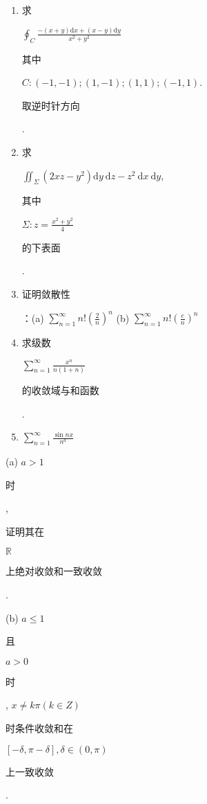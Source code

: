\documentclass[10pt]{article}
\begin{document}
\begin{enumerate}
  \item \begin{CJK}{UTF8}{mj}求\end{CJK} $\oint_{C} \frac{-(x+y) \mathrm{d} x+(x-y) \mathrm{d} y}{x^{2}+y^{2}}$ \begin{CJK}{UTF8}{mj}其中\end{CJK} $C:(-1,-1) ;(1,-1) ;(1,1) ;(-1,1)$. \begin{CJK}{UTF8}{mj}取逆时针方向\end{CJK}.

  \item \begin{CJK}{UTF8}{mj}求\end{CJK} $\iint_{\Sigma}\left(2 x z-y^{2}\right) \mathrm{d} y \mathrm{~d} z-z^{2} \mathrm{~d} x \mathrm{~d} y$, \begin{CJK}{UTF8}{mj}其中\end{CJK} $\Sigma: z=\frac{x^{2}+y^{2}}{4}$ \begin{CJK}{UTF8}{mj}的下表面\end{CJK}.

  \item \begin{CJK}{UTF8}{mj}证明敛散性\end{CJK}：(a) $\sum_{n=1}^{\infty} n !\left(\frac{2}{n}\right)^{n}$ (b) $\sum_{n=1}^{\infty} n !\left(\frac{e}{n}\right)^{n}$

  \item \begin{CJK}{UTF8}{mj}求级数\end{CJK} $\sum_{n=1}^{\infty} \frac{x^{n}}{n(1+n)}$ \begin{CJK}{UTF8}{mj}的收敛域与和函数\end{CJK}.

  \item $\sum_{n=1}^{\infty} \frac{\sin n x}{n^{a}}$

\end{enumerate}
(a) $a>1$ \begin{CJK}{UTF8}{mj}时\end{CJK}, \begin{CJK}{UTF8}{mj}证明其在\end{CJK} $\mathbb{R}$ \begin{CJK}{UTF8}{mj}上绝对收敛和一致收敛\end{CJK}.

(b) $a \leq 1$ \begin{CJK}{UTF8}{mj}且\end{CJK} $a>0$ \begin{CJK}{UTF8}{mj}时\end{CJK}, $x \neq k \pi(k \in Z)$ \begin{CJK}{UTF8}{mj}时条件收敛和在\end{CJK} $[-\delta, \pi-\delta], \delta \in(0, \pi)$ \begin{CJK}{UTF8}{mj}上一致收敛\end{CJK}.
\end{document}
